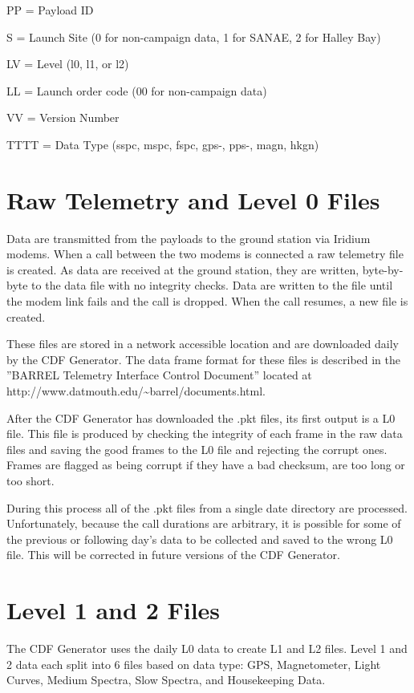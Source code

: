 \documentclass{article}
\begin{document}
PP = Payload ID

S = Launch Site (0 for non-campaign data, 1 for SANAE, 2 for Halley Bay)

LV =  Level (l0, l1, or l2)

LL = Launch order code (00 for non-campaign data)

VV = Version Number

TTTT = Data Type (sspc, mspc, fspc, gps-, pps-, magn, hkgn)

\section{Raw Telemetry and Level 0 Files}
Data are transmitted from the payloads to the ground station via Iridium modems. When a call between the two modems is connected a raw telemetry file is created. As data are received at the ground station, they are written, byte-by-byte to the data file with no integrity checks. Data are written to the file until the modem link fails and the call is dropped. When the call resumes, a new file is created.

These files are stored in a network accessible location and are downloaded daily by the CDF Generator. The data frame format for these files is described in the ''BARREL Telemetry Interface Control Document'' located at http://www.datmouth.edu/\~{}barrel/documents.html.

After the CDF Generator has downloaded the .pkt files, its first output is a L0 file. This file is produced by checking the integrity of each frame in the raw data files and saving the good frames to the L0 file and rejecting the corrupt ones. Frames are flagged as being corrupt if they have a bad checksum, are too long or too short. 

During this process all of the .pkt files from a single date directory are processed. Unfortunately, because the call durations are arbitrary, it is possible for some of the previous or following day's data to be collected and saved to the wrong L0 file. This will be corrected in future versions of the CDF Generator.


\section{Level 1 and 2 Files}
The CDF Generator uses the daily L0 data to create L1 and L2 files. Level 1 and 2 data each split into 6 files based on data type: GPS, Magnetometer, Light Curves, Medium Spectra, Slow Spectra, and Housekeeping Data.
\end{document}
